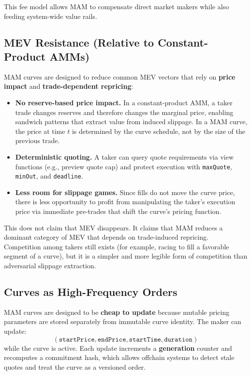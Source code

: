 \documentclass[version=preprint]{iacrcc}
\begin{document}
This fee model allows MAM to compensate direct market makers while also feeding system-wide value rails.

\subsection{MEV Resistance (Relative to Constant-Product AMMs)}

MAM curves are designed to reduce common MEV vectors that rely on \textbf{price impact} and \textbf{trade-dependent repricing}:

\begin{itemize}
  \item \textbf{No reserve-based price impact.} In a constant-product AMM, a taker trade changes reserves and therefore changes the marginal price, enabling sandwich patterns that extract value from induced slippage. In a MAM curve, the price at time $t$ is determined by the curve schedule, not by the size of the previous trade.
  \item \textbf{Deterministic quoting.} A taker can query quote requirements via view functions (e.g., preview quote cap) and protect execution with \texttt{maxQuote}, \texttt{minOut}, and \texttt{deadline}.
  \item \textbf{Less room for slippage games.} Since fills do not move the curve price, there is less opportunity to profit from manipulating the taker's execution price via immediate pre-trades that shift the curve's pricing function.
\end{itemize}

This does not claim that MEV disappears. It claims that MAM reduces a dominant category of MEV that depends on trade-induced repricing. Competition among takers still exists (for example, racing to fill a favorable segment of a curve), but it is a simpler and more legible form of competition than adversarial slippage extraction.

\subsection{Curves as High-Frequency Orders}

MAM curves are designed to be \textbf{cheap to update} because mutable pricing parameters are stored separately from immutable curve identity. The maker can update:
\[
(\texttt{startPrice}, \texttt{endPrice}, \texttt{startTime}, \texttt{duration})
\]
while the curve is active. Each update increments a \textbf{generation} counter and recomputes a commitment hash, which allows offchain systems to detect stale quotes and treat the curve as a versioned order.
\end{document}
